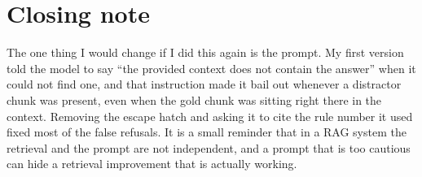 \documentclass[11pt,a4paper]{article}
\begin{document}
\section{Closing note}

The one thing I would change if I did this again is the prompt. My first version told the model
to say ``the provided context does not contain the answer'' when it could not find one, and that
instruction made it bail out whenever a distractor chunk was present, even when the gold chunk
was sitting right there in the context. Removing the escape hatch and asking it to cite the rule
number it used fixed most of the false refusals. It is a small reminder that in a RAG system the
retrieval and the prompt are not independent, and a prompt that is too cautious can hide a
retrieval improvement that is actually working.
\end{document}

